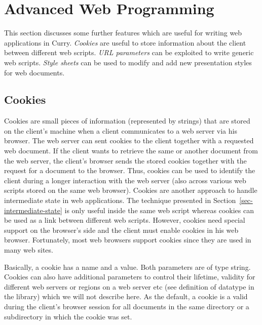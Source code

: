 \section{Advanced Web Programming}
\label{sec-advanced-web-programming}

This section discusses some further features which are useful
for writing web applications in Curry.
\emph{Cookies} are useful to store information about the client
between different web scripts.
\emph{URL parameters} can be exploited to write generic web scripts.
\emph{Style sheets} can be used to modify and add new presentation styles
for web documents.


\subsection{Cookies}

Cookies are small pieces of information
(represented by strings) that are stored on the client's machine
when a client communicates to a web server via his browser.
The web server can sent cookies to the client together
with a requested web document. If the client wants to retrieve
the same or another document from the web server, the client's browser
sends the stored cookies together with the request for a document
to the browser.
Thus, cookies can be used to identify the client during a longer
interaction with the web server (also across various web scripts
stored on the same web browser).
Cookies are another approach to handle intermediate state
in web applications. The technique presented in
Section~\ref{sec-intermediate-state} is only useful
inside the same web script whereas cookies can be used
as a link between different web scripts.
However, cookies need special support on the browser's side
and the client must enable cookies in his web browser.
Fortunately, most web browsers support cookies
since they are used in many web sites.

Basically, a cookie has a name and a value.
Both parameters are of type string.
Cookies can also have additional parameters to control their
lifetime, validity for different web servers or regions
on a web server etc (see definition of datatype
 in the  library) which we will not describe
here. As the default, a cookie is a valid during the client's
browser session for all documents in the same directory or
a subdirectory in which the cookie was set.

